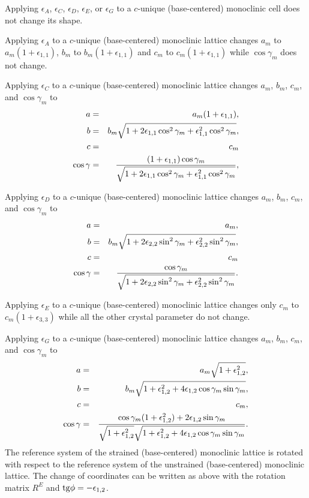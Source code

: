 \documentclass[12pt,a4paper,twoside]{report}
\begin{document}
Applying $\epsilon_A$, $\epsilon_C$, $\epsilon_D$, $\epsilon_E$, or
$\epsilon_G$ to a $c$-unique (base-centered) monoclinic cell does 
not change its shape.

Applying $\epsilon_A$ to a $c$-unique (base-centered) monoclinic 
lattice changes
$a_m$ to $a_m(1+\epsilon_{1,1})$, $b_m$ to $b_m(1+\epsilon_{1,1})$
and $c_m$ to $c_m(1+\epsilon_{1,1})$ while $\cos \gamma_m$
does not change.

Applying $\epsilon_C$ to a $c$-unique (base-centered) monoclinic lattice 
changes $a_m$, $b_m$, $c_m$, and $\cos \gamma_m$ to 
\begin{eqnarray}
a&=&a_m(1+\epsilon_{1,1}), \\
b&=&b_m \sqrt{1+2 \epsilon_{1,1}\cos^2\gamma_m
+\epsilon_{1,1}^2 \cos^2\gamma_m}, \\
c&=&c_m \\
\cos\gamma &=& {(1+\epsilon_{1,1}) \cos\gamma_m \over 
\sqrt{1+2 \epsilon_{1,1}\cos^2\gamma_m
+\epsilon_{1,1}^2 \cos^2\gamma_m}},
\end{eqnarray}

Applying $\epsilon_D$ to a $c$-unique (base-centered) monoclinic lattice 
changes $a_m$, $b_m$, $c_m$, and $\cos \gamma_m$ to 
\begin{eqnarray}
a&=&a_m, \\
b&=&b_m \sqrt{1+2 \epsilon_{2,2}\sin^2\gamma_m
+\epsilon_{2,2}^2 \sin^2\gamma_m}, \\
c&=&c_m \\
\cos\gamma &=& {\cos\gamma_m \over 
\sqrt{1+2 \epsilon_{2,2}\sin^2\gamma_m
+\epsilon_{2,2}^2 \sin^2\gamma_m}}.
\end{eqnarray}

Applying $\epsilon_E$ to a $c$-unique (base-centered) monoclinic 
lattice changes
only $c_m$ to $c_m(1+\epsilon_{3,3})$ while all the other crystal
parameter do not change.

Applying $\epsilon_G$ to a $c$-unique (base-centered) monoclinic lattice 
changes $a_m$, $b_m$, $c_m$, and $\cos \gamma_m$ to 
\begin{eqnarray}
a&=&a_m \sqrt{1+\epsilon_{1,2}^2}, \\
b&=&b_m \sqrt{1+\epsilon_{1,2}^2
+4\epsilon_{1,2} \cos\gamma_m \sin\gamma_m}, \\
c&=&c_m, \\
\cos\gamma &=& {\cos\gamma_m (1+\epsilon_{1,2}^2) + 2 \epsilon_{1,2} 
\sin \gamma_m \over \sqrt{1+\epsilon_{1,2}^2}
\sqrt{1+\epsilon_{1,2}^2+4\epsilon_{1,2} \cos\gamma_m \sin\gamma_m}}.
\end{eqnarray}
The reference system of the strained (base-centered) monoclinic 
lattice is rotated 
with respect to the reference system of the unstrained  
(base-centered) monoclinic lattice. 
The change of coordinates can be written as above with the rotation matrix 
$R^E$ and ${\rm tg}\phi=-\epsilon_{1,2}$.
\end{document}
